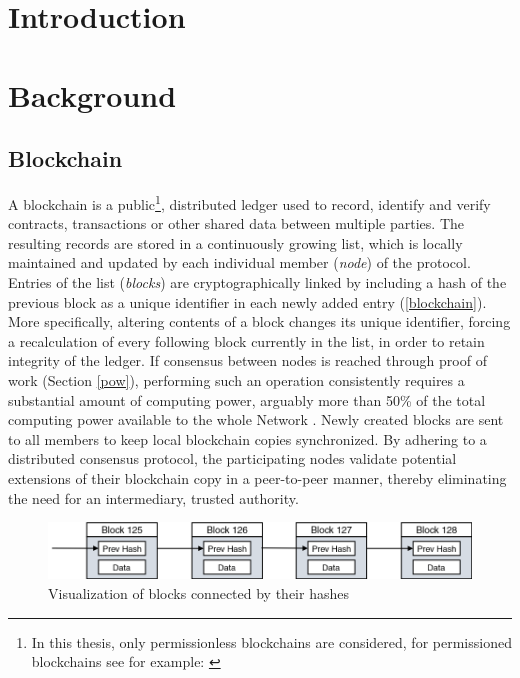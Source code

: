 \documentclass[a4paper,12pt,twoside]{report}
\begin{document}

\fancyhead{}
\pagestyle{fancy}
\fancyhead[LE]{\slshape \leftmark}
\fancyhead[RO]{\slshape \rightmark}
\headheight=15pt





\chapter{Introduction}



\chapter{Background}
\section{Blockchain}
A blockchain is a public\footnote{In this thesis, only permissionless blockchains are considered, for permissioned blockchains see for example: \cite{permissioned}}, distributed ledger used to record, identify and verify contracts, transactions or other shared data between multiple parties. The resulting records are stored in a continuously growing list, which is locally maintained and updated by each individual member (\textit{node}) of the protocol. Entries of the list (\textit{blocks}) are cryptographically linked by including a hash of the previous block as a unique identifier in each newly added entry (\autoref{blockchain}). More specifically, altering contents of a block changes its unique identifier, forcing a recalculation of every following block currently in the list, in order to retain integrity of the ledger. If consensus between nodes is reached through proof of work (Section \ref{pow}), performing such an operation consistently requires a substantial amount of computing power, arguably more than 50\% of the total computing power available to the whole Network \cite{nakamoto2008bitcoin}. Newly created blocks are sent to all members to keep local blockchain copies synchronized. By adhering to a distributed consensus protocol, the participating nodes validate potential extensions of their blockchain copy in a peer-to-peer manner, thereby eliminating the need for an intermediary, trusted authority. 

\begin{figure}[ht]
	\centering
  \includegraphics[width=\textwidth]{blockchain.png}
	\caption{Visualization of blocks connected by their hashes}
	\label{blockchain}
\end{figure}
 
\end{document}

